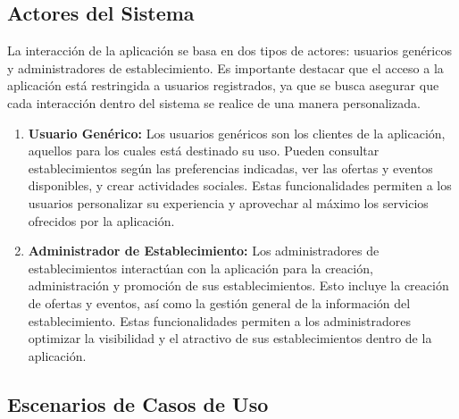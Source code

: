 \subsection{Actores del Sistema}

La interacción de la aplicación se basa en dos tipos de actores: usuarios genéricos y administradores de establecimiento. Es importante destacar que el acceso a la aplicación está restringida a usuarios registrados, ya que se busca asegurar que cada interacción dentro del sistema se realice de una manera personalizada.

\begin{enumerate}
    \item \textbf{Usuario Genérico:} Los usuarios genéricos son los clientes de la aplicación, aquellos para los cuales está destinado su uso. Pueden consultar establecimientos según las preferencias indicadas, ver las ofertas y eventos disponibles, y crear actividades sociales. Estas funcionalidades permiten a los usuarios personalizar su experiencia y aprovechar al máximo los servicios ofrecidos por la aplicación.

    \item \textbf{Administrador de Establecimiento:} Los administradores de establecimientos interactúan con la aplicación para la creación, administración y promoción de sus establecimientos. Esto incluye la creación de ofertas y eventos, así como la gestión general de la información del establecimiento. Estas funcionalidades permiten a los administradores optimizar la visibilidad y el atractivo de sus establecimientos dentro de la aplicación.
\end{enumerate}

\subsection{Escenarios de Casos de Uso}

